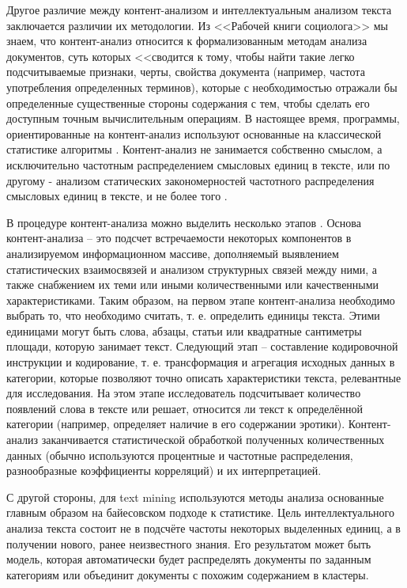 Другое различие между контент-анализом и интеллектуальным анализом текста заключается различии их методологии. Из <<Рабочей книги социолога>> мы знаем, что контент-анализ относится к формализованным методам анализа документов, суть которых <<сводится к тому, чтобы найти такие легко подсчитываемые признаки, черты, свойства документа (например, частота употребления определенных терминов), которые с необходимостью отражали бы определенные существенные стороны содержания с тем, чтобы сделать его доступным точным вычислительным операциям. В настоящее время, программы, ориентированные на контент-анализ используют основанные на классической статистике алгоритмы \cite[стр. 735]{tm_and_ca}. Контент-анализ не занимается собственно смыслом, а исключительно частотным распределением смысловых единиц в тексте, или по другому - анализом статических закономерностей частотного распределения смысловых единиц в тексте, и не более того \cite[стр. 15]{Averianov2007}. 

В процедуре контент-анализа можно выделить несколько этапов \cite[стр. 12-13]{Morozova2007}. Основа контент-анализа – это подсчет встречаемости некоторых компонентов в анализируемом информационном массиве, дополняемый выявлением статистических взаимосвязей и анализом структурных связей между ними, а также снабжением их теми или иными количественными или качественными характеристиками. Таким образом, на первом этапе контент-анализа необходимо выбрать то, что необходимо считать, т. е. определить единицы текста. Этими единицами могут быть слова, абзацы, статьи или квадратные сантиметры площади, которую занимает текст. Следующий этап -- составление кодировочной инструкции и кодирование, т. е. трансформация и агрегация исходных данных в категории, которые позволяют точно описать характеристики текста, релевантные для исследования. На этом этапе исследователь подсчитывает количество появлений слова в тексте или решает, относится ли текст к определённой категории (например, определяет наличие в его содержании эротики). Контент-анализ заканчивается статистической обработкой полученных количественных данных (обычно используются процентные и частотные распределения, разнообразные коэффициенты корреляций) и их интерпретацией.

С другой стороны, для text mining используются методы анализа основанные главным образом на байесовском подходе к статистике. Цель интеллектуального анализа текста состоит не в подсчёте частоты некоторых выделенных единиц, а в получении нового, ранее неизвестного знания. Его результатом может быть модель, которая автоматически будет распределять документы по заданным категориям или объединит документы с похожим содержанием в кластеры.


